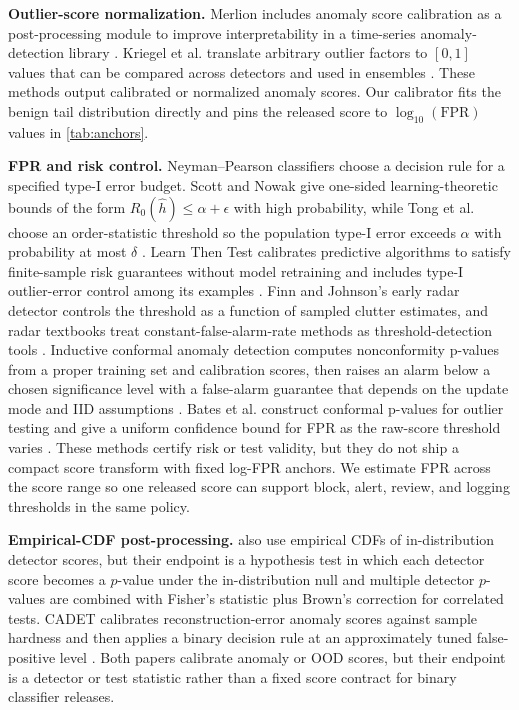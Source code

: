 \documentclass{article}
\begin{document}
\textbf{Outlier-score normalization.}
Merlion includes anomaly score calibration as a post-processing module to improve interpretability in a time-series anomaly-detection library \citep{bhatnagar2023}.
Kriegel et al. translate arbitrary outlier factors to $[0,1]$ values that can be compared across detectors and used in ensembles \citep{kriegel2011}.
These methods output calibrated or normalized anomaly scores.
Our calibrator fits the benign tail distribution directly and pins the released score to $\log_{10}(\mathrm{FPR})$ values in \cref{tab:anchors}.

\textbf{FPR and risk control.}
Neyman--Pearson classifiers choose a decision rule for a specified type-I error budget.
Scott and Nowak give one-sided learning-theoretic bounds of the form $R_0(\hat h)\le \alpha+\epsilon$ with high probability, while Tong et al. choose an order-statistic threshold so the population type-I error exceeds $\alpha$ with probability at most $\delta$ \citep{scott2005,tong2018}.
Learn Then Test calibrates predictive algorithms to satisfy finite-sample risk guarantees without model retraining and includes type-I outlier-error control among its examples \citep{angelopoulos2025}.
Finn and Johnson's early radar detector controls the threshold as a function of sampled clutter estimates, and radar textbooks treat constant-false-alarm-rate methods as threshold-detection tools \citep{finn1968,richards2014}.
Inductive conformal anomaly detection computes nonconformity p-values from a proper training set and calibration scores, then raises an alarm below a chosen significance level with a false-alarm guarantee that depends on the update mode and IID assumptions \citep{laxhammar2015}.
Bates et al. construct conformal p-values for outlier testing and give a uniform confidence bound for FPR as the raw-score threshold varies \citep{bates2023}.
These methods certify risk or test validity, but they do not ship a compact score transform with fixed log-FPR anchors.
We estimate FPR across the score range so one released score can support block, alert, review, and logging thresholds in the same policy.

\textbf{Empirical-CDF post-processing.}
\citet{dadalto2024} also use empirical CDFs of in-distribution detector scores, but their endpoint is a hypothesis test in which each detector score becomes a $p$-value under the in-distribution null and multiple detector $p$-values are combined with Fisher's statistic plus Brown's correction for correlated tests.
CADET calibrates reconstruction-error anomaly scores against sample hardness and then applies a binary decision rule at an approximately tuned false-positive level \citep{deng2022}.
Both papers calibrate anomaly or OOD scores, but their endpoint is a detector or test statistic rather than a fixed score contract for binary classifier releases.
\end{document}
